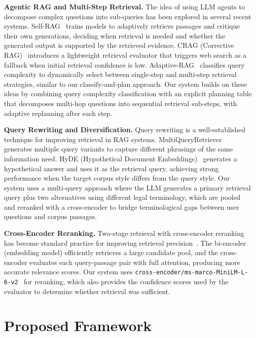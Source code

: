 \documentclass{article}
\begin{document}
\textbf{Agentic RAG and Multi-Step Retrieval.}
The idea of using LLM agents to decompose complex questions into sub-queries has been explored in several recent systems. Self-RAG~\cite{selfrag2024} trains models to adaptively retrieve passages and critique their own generations, deciding when retrieval is needed and whether the generated output is supported by the retrieved evidence. CRAG (Corrective RAG)~\cite{crag2024} introduces a lightweight retrieval evaluator that triggers web search as a fallback when initial retrieval confidence is low. Adaptive-RAG~\cite{adaptiverag2024} classifies query complexity to dynamically select between single-step and multi-step retrieval strategies, similar to our classify-and-plan approach. Our system builds on these ideas by combining query complexity classification with an explicit planning table that decomposes multi-hop questions into sequential retrieval sub-steps, with adaptive replanning after each step.

\textbf{Query Rewriting and Diversification.}
Query rewriting is a well-established technique for improving retrieval in RAG systems. MultiQueryRetriever~\cite{langchain2023} generates multiple query variants to capture different phrasings of the same information need. HyDE (Hypothetical Document Embeddings)~\cite{hyde2023} generates a hypothetical answer and uses it as the retrieval query, achieving strong performance when the target corpus style differs from the query style. Our system uses a multi-query approach where the LLM generates a primary retrieval query plus two alternatives using different legal terminology, which are pooled and reranked with a cross-encoder to bridge terminological gaps between user questions and corpus passages.

\textbf{Cross-Encoder Reranking.}
Two-stage retrieval with cross-encoder reranking has become standard practice for improving retrieval precision~\cite{nogueira2019passage}. The bi-encoder (embedding model) efficiently retrieves a large candidate pool, and the cross-encoder evaluates each query-passage pair with full attention, producing more accurate relevance scores. Our system uses \texttt{cross-encoder/ms-marco-MiniLM-L-6-v2}~\cite{reimers2019sentencebert} for reranking, which also provides the confidence scores used by the evaluator to determine whether retrieval was sufficient.

\section{Proposed Framework}
\end{document}
